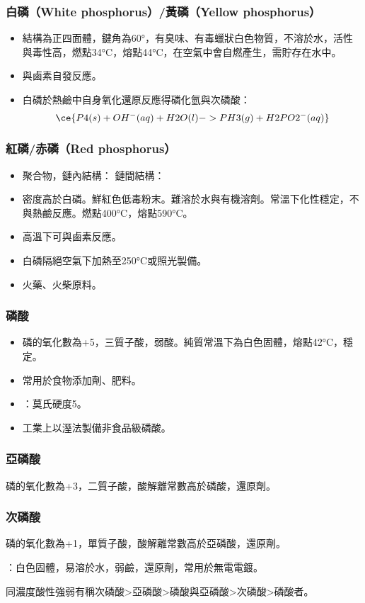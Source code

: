 \documentclass[a4paper,12pt]{report}
\begin{document}
\subsubsection{白磷（White phosphorus）/黃磷（Yellow phosphorus）}
\begin{itemize}
\item 結構為正四面體，鍵角為60°，有臭味、有毒蠟狀白色物質，不溶於水，活性與毒性高，燃點34°C，熔點44°C，在空氣中會自燃產生，需貯存在水中。
\item 與鹵素自發反應。
\item 白磷於熱鹼中自身氧化還原反應得磷化氫與次磷酸：
\[\ce{P4(s) + OH^-(aq) + H2O(l) -> PH3(g) + H2PO2^-(aq)}\]
\end{itemize}
\subsubsection{紅磷/赤磷（Red phosphorus）}
\begin{itemize}
\item 聚合物，鏈內結構：
\bct\bfH\ctr{}\ef\FB\ect
鏈間結構：
\bct\bfH\ctr{}\ef\FB\ect
\item 密度高於白磷。鮮紅色低毒粉末。難溶於水與有機溶劑。常溫下化性穩定，不與熱鹼反應。燃點400°C，熔點590°C。
\item 高溫下可與鹵素反應。
\item 白磷隔絕空氣下加熱至250°C或照光製備。
\item 火藥、火柴原料。
\end{itemize}
\subsubsection{磷酸}
\begin{itemize}
\item 磷的氧化數為+5，三質子酸，弱酸。純質常溫下為白色固體，熔點42°C，穩定。
\item 常用於食物添加劑、肥料。
\item {}：莫氏硬度5。
\item 工業上以溼法製備非食品級磷酸。
\end{itemize}
\subsubsection{亞磷酸}
磷的氧化數為+3，二質子酸，酸解離常數高於磷酸，還原劑。
\subsubsection{次磷酸}
\bit
\item 磷的氧化數為+1，單質子酸，酸解離常數高於亞磷酸，還原劑。
\item {}：白色固體，易溶於水，弱鹼，還原劑，常用於無電電鍍。
\item 同濃度酸性強弱有稱次磷酸>亞磷酸>磷酸與亞磷酸>次磷酸>磷酸者。
\eit
\end{document}
